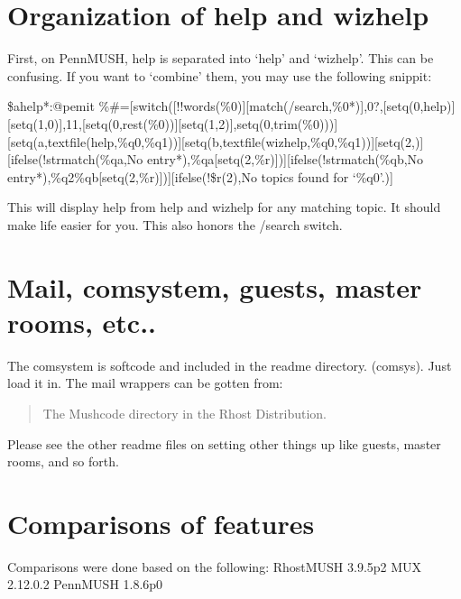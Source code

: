 \documentclass[letterpaper,10pt,english]{sphinxmanual}
\begin{document}
\section{Organization of help and wizhelp}
\label{\detokenize{differences:organization-of-help-and-wizhelp}}
\sphinxAtStartPar
First, on PennMUSH, help is separated into ‘help’ and ‘wizhelp’.  This can
be confusing. If you want to ‘combine’ them, you may use the following snippit:

\sphinxAtStartPar
\$ahelp*:@pemit \%\#={[}switch({[}!!words(\%0){]}{[}match(/search,\%0*){]},0?,{[}setq(0,help){]}{[}setq(1,0){]},11,{[}setq(0,rest(\%0)){]}{[}setq(1,2){]},setq(0,trim(\%0))){]}{[}setq(a,textfile(help,\%q0,\%q1)){]}{[}setq(b,textfile(wizhelp,\%q0,\%q1)){]}{[}setq(2,){]}{[}ifelse(!strmatch(\%qa,No entry*),\%qa{[}setq(2,\%r){]}){]}{[}ifelse(!strmatch(\%qb,No entry*),\%q2\%qb{[}setq(2,\%r){]}){]}{[}ifelse(!\$r(2),No topics found for ‘\%q0’.){]}

\sphinxAtStartPar
This will display help from help and wizhelp for any matching topic.  It
should make life easier for you.  This also honors the /search switch.


\section{Mail, comsystem, guests, master rooms, etc..}
\label{\detokenize{differences:mail-comsystem-guests-master-rooms-etc}}
\sphinxAtStartPar
The comsystem is softcode and included in the readme directory. (comsys).
Just load it in.  The mail wrappers can be gotten from:
\begin{quote}

\sphinxAtStartPar
The Mushcode directory in the Rhost Distribution.
\end{quote}

\sphinxAtStartPar
Please see the other readme files on setting other things up like
guests, master rooms, and so forth.


\section{Comparisons of features}
\label{\detokenize{differences:comparisons-of-features}}
\sphinxAtStartPar
Comparisons were done based on the following:
RhostMUSH 3.9.5p2
MUX 2.12.0.2
PennMUSH 1.8.6p0
\end{document}
